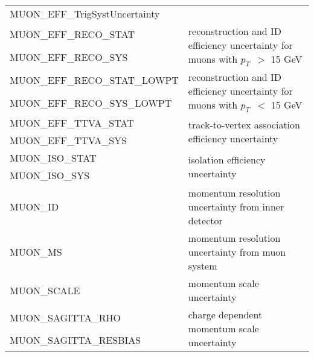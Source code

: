 \begin{table}
{\begin{tabular}{ll}
MUON\_EFF\_TrigSystUncertainty & & \\ %
MUON\_EFF\_RECO\_STAT &  \multirow{2}{*}{reconstruction and ID efficiency uncertainty for muons with $p_T$\ $>$ 15 GeV} \\%
MUON\_EFF\_RECO\_SYS &  &\\
MUON\_EFF\_RECO\_STAT\_LOWPT & \multirow{2}{*}{reconstruction and ID efficiency uncertainty for muons with $p_T$\ $<$ 15 GeV} \\%
MUON\_EFF\_RECO\_SYS\_LOWPT &  \\%
MUON\_EFF\_TTVA\_STAT\footnotemark[10] &  \multirow{2}{*}{track-to-vertex association efficiency uncertainty} \\%
MUON\_EFF\_TTVA\_SYS\footnotemark[10] &                      \\%
MUON\_ISO\_STAT &  \multirow{2}{*}{isolation efficiency uncertainty} \\%
MUON\_ISO\_SYS &                     \\%
MUON\_ID & momentum resolution uncertainty from inner detector        \\%
MUON\_MS &  momentum resolution uncertainty from muon system        \\%
MUON\_SCALE &   momentum scale uncertainty         \\%
MUON\_SAGITTA\_RHO & \multirow{2}{*}{charge dependent momentum scale uncertainty} \\%
MUON\_SAGITTA\_RESBIAS &  \\%

\end{tabular}}
\end{table}
